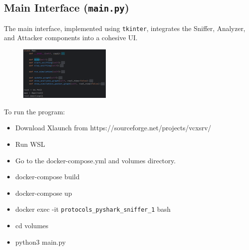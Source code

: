 \documentclass{article}
\begin{document}
\subsection{Main Interface (\texttt{main.py})}
The main interface, implemented using \texttt{tkinter}, integrates the Sniffer, Analyzer, and Attacker components into a cohesive UI.
\begin{figure}[H]
    \centering
    \includegraphics[width=0.4\textwidth]{main.png}
\end{figure}
To run the program:
\begin{itemize}
    \item Download Xlaunch from https://sourceforge.net/projects/vcxsrv/ 
    \item Run WSL
    \item Go to the docker-compose.yml and volumes directory.
    \item docker-compose build
    \item docker-compose up
    \item docker exec -it \texttt{protocols\_pyshark\_sniffer\_1} bash
    \item cd volumes
    \item python3 main.py
\end{itemize}
\end{document}

